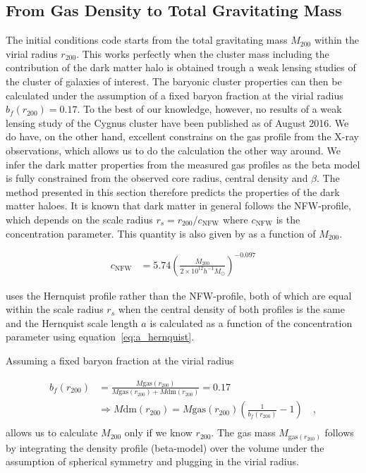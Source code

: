 \documentclass[MScProj_TLRH_ClusterEnergy.tex]{subfiles}
\begin{document}
\newpage
\subsection{From Gas Density to Total Gravitating Mass}
\label{sec:gas-to-dm}
The initial conditions code  starts from the total gravitating
mass $M_{200}$ within the virial radius $r_{200}$. This works perfectly when the 
cluster mass including the contribution of the dark matter halo is obtained 
trough a weak lensing studies of the cluster of galaxies of interest. The 
baryonic cluster properties can then be calculated under the assumption of 
a fixed baryon fraction at the virial radius $b_f(r_{200})=0.17$. To the best
of our knowledge, however, no results of a weak lensing study of the Cygnus 
cluster have been published as of August 2016. We do have, on the other hand, 
excellent constrains on the gas profile from the X-ray observations, which allows
us to do the calculation the other way around. We infer the dark matter properties
from the measured gas profiles as the beta model is fully constrained from the
observed core radius, central density and $\beta$. The method presented in this
section therefore predicts the properties of the dark matter haloes. It is known
that dark matter in general follows the NFW-profile, which depends on the scale
radius $r_s = r_{200}/c_{\text{NFW}}$ where $c_{\text{NFW}}$ is the concentration
parameter. This quantity is also given by \citet{2008MNRAS.390L..64D} as a 
function of $M_{200}$.

\begin{align}
    c_{\text{NFW}} &= 5.74 \left( \frac{M_{200}}{2 \times 10^{12} h^{-1} M_\odot} \right)^{-0.097}
\end{align}

 uses the Hernquist profile rather than the NFW-profile, both
of which are equal within the scale radius $r_s$ when the central density of 
both profiles is the same and the Hernquist scale length $a$ is calculated as a
function of the concentration parameter using equation~\eqref{eq:a_hernquist}.

Assuming a fixed baryon fraction at the virial radius

\begin{align}
    b_f(r_{200}) &= \frac{M\text{gas}(r_{200})}{M\text{gas}(r_{200}) + M\text{dm}(r_{200})} = 0.17 \\
                 &\Rightarrow M\text{dm}(r_{200}) = M\text{gas}(r_{200})\left(\frac{1}{b_f(r_{200})} - 1 \right) \quad , \\
\end{align}
\noindent allows us to calculate $M_{200}$ only if we know $r_{200}$. The gas 
mass $M_{\text{gas}(r_{200})}$ follows by integrating the density profile 
(beta-model) over the volume under the assumption of spherical symmetry and
plugging in the virial radius.
\end{document}
